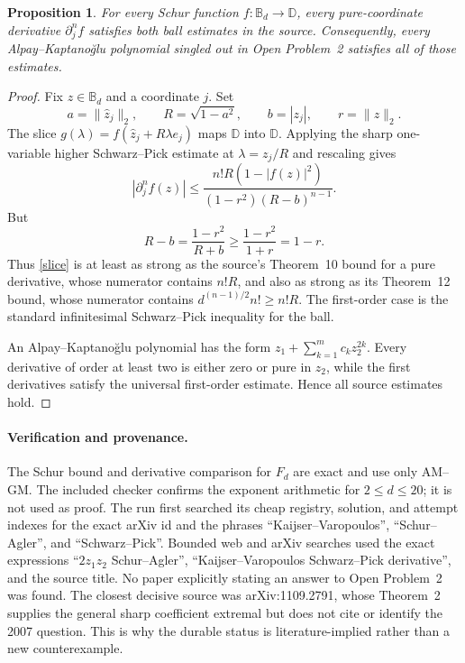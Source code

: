 \documentclass[11pt]{article}
\newtheorem*{proposition}{Proposition}
\newcommand{\D}{\mathbb D}
\newcommand{\B}{\mathbb B}
\begin{document}
\begin{proposition}
For every Schur function $f:\B_d\to\D$, every pure-coordinate derivative
$\partial_j^nf$ satisfies both ball estimates in the source.  Consequently,
every Alpay--Kaptano\u{g}lu polynomial singled out in Open Problem~2 satisfies
all of those estimates.
\end{proposition}

\begin{proof}
Fix $z\in\B_d$ and a coordinate $j$.  Set
\[
 a=\|\widehat z_j\|_2,\qquad R=\sqrt{1-a^2},\qquad
 b=|z_j|,\qquad r=\|z\|_2.
\]
The slice $g(\lambda)=f(\widehat z_j+R\lambda e_j)$ maps $\D$ into
$\D$.  Applying the sharp one-variable higher Schwarz--Pick estimate at
$\lambda=z_j/R$ and rescaling gives
\begin{equation}\label{slice}
 |\partial_j^nf(z)|
 \le \frac{n!R(1-|f(z)|^2)}{(1-r^2)(R-b)^{n-1}}.
\end{equation}
But
\[
 R-b=\frac{1-r^2}{R+b}\ge\frac{1-r^2}{1+r}=1-r.
\]
Thus \eqref{slice} is at least as strong as the source's Theorem~10 bound for
a pure derivative, whose numerator contains $n!R$, and also as strong as its
Theorem~12 bound, whose numerator contains
$d^{(n-1)/2}n!\ge n!R$.  The first-order case is the standard infinitesimal
Schwarz--Pick inequality for the ball.

An Alpay--Kaptano\u{g}lu polynomial has the form
$z_1+\sum_{k=1}^m c_kz_2^{2k}$.  Every derivative of order at least two is
either zero or pure in $z_2$, while the first derivatives satisfy the universal
first-order estimate.  Hence all source estimates hold.
\end{proof}

\paragraph{Verification and provenance.}
The Schur bound and derivative comparison for $F_d$ are exact and use only
AM--GM.  The included checker confirms the exponent arithmetic for
$2\le d\le20$; it is not used as proof.  The run first searched its cheap
registry, solution, and attempt indexes for the exact arXiv id and the phrases
``Kaijser--Varopoulos'', ``Schur--Agler'', and ``Schwarz--Pick''.  Bounded web
and arXiv searches used the exact expressions ``$2z_1z_2$ Schur--Agler'',
``Kaijser--Varopoulos Schwarz--Pick derivative'', and the source title.  No
paper explicitly stating an answer to Open Problem~2 was found.  The closest
decisive source was arXiv:1109.2791, whose Theorem~2 supplies the general sharp
coefficient extremal but does not cite or identify the 2007 question.  This is
why the durable status is literature-implied rather than a new counterexample.
\end{document}
